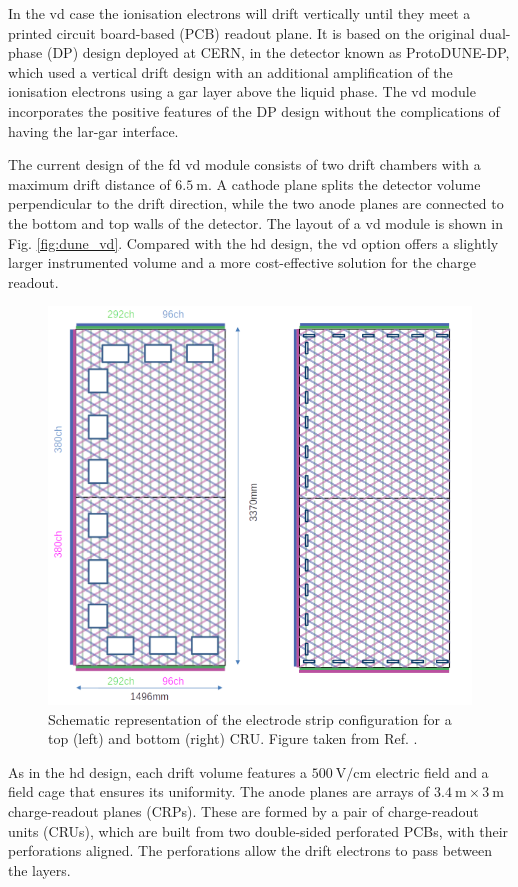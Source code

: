 In the \gls{vd} case the ionisation electrons will drift vertically until they meet a printed circuit board-based (PCB) readout plane. It is based on the original dual-phase (DP) design deployed at CERN, in the detector known as ProtoDUNE-DP, which used a vertical drift design with an additional amplification of the ionisation electrons using a \gls{gar} layer above the liquid phase. The \gls{vd} module incorporates the positive features of the DP design without the complications of having the \gls{lar}-\gls{gar} interface.

The current design of the \gls{fd} \gls{vd} module consists of two drift chambers with a maximum drift distance of $6.5~\mathrm{m}$. A cathode plane splits the detector volume perpendicular to the drift direction, while the two anode planes are connected to the bottom and top walls of the detector. The layout of a \gls{vd} module is shown in Fig. \ref{fig:dune_vd}. Compared with the \gls{hd} design, the \gls{vd} option offers a slightly larger instrumented volume and a more cost-effective solution for the charge readout.

\begin{figure}[t]
	\centering
	\includegraphics[width=0.70\linewidth]{Images/DUNE/FD/3V_anode_layout}
	\caption[Schematic representation of the electrode strip configuration for a top and bottom CRU.]{Schematic representation of the electrode strip configuration for a top (left) and bottom (right) CRU. Figure taken from Ref. \cite{DUNEVDTDR}.}
	\label{fig:dune_cru}
\end{figure}

As in the \gls{hd} design, each drift volume features a $500~\mathrm{V/cm}$ electric field and a field cage that ensures its uniformity. The anode planes are arrays of $3.4~\mathrm{m}\times3~\mathrm{m}$ charge-readout planes (CRPs). These are formed by a pair of charge-readout units (CRUs), which are built from two double-sided perforated PCBs, with their perforations aligned. The perforations allow the drift electrons to pass between the layers.


